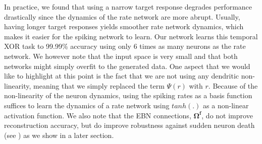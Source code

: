 \documentclass[twoside,11pt,titlepage]{article}
\begin{document}
In practice, we found that using a narrow target response degrades performance drastically
since the dynamics of the rate network are more abrupt. Usually, having longer target responses
yields smoother rate network dynamics, which makes it easier for the spiking network to learn.
Our network learns this temporal XOR task to 99.99\% accuracy using only 6 times as many neurons
as the rate network. We however note that the input space is very small and that both networks
might simply overfit to the generated data. One aspect that we would like to highlight at this point
is the fact that we are not using any dendritic non-linearity, meaning that we simply replaced
the term $\Psi(r)$ with $r$. Because of the non-linearity of the neuron dynamics, using the
spiking rates as a basis function suffices to learn the dynamics of a rate network using $tanh(.)$ as a
non-linear activation function. We also note that the EBN connections, $\mathbf{\Omega^f}$,
do not improve reconstruction accuracy, but do improve robustness against sudden neuron death (see \cite{alemi2017learning})
as we show in a later section.
\end{document}
